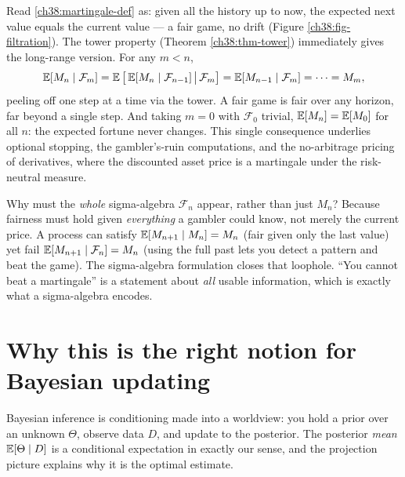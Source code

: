 \begin{applicationbox}
Read \eqref{ch38:martingale-def} as: given all the history up to now, the expected next value equals
the current value --- a fair game, no drift (Figure \ref{ch38:fig-filtration}). The tower property
(Theorem \ref{ch38:thm-tower}) immediately gives the long-range version. For any $m < n$,
\[
  \operatorname{\mathbb{E}}[M_n \mid \mathcal{F}_m]
  = \operatorname{\mathbb{E}}\big[\operatorname{\mathbb{E}}[M_n\mid\mathcal{F}_{n-1}] \,\big|\, \mathcal{F}_m\big]
  = \operatorname{\mathbb{E}}[M_{n-1}\mid\mathcal{F}_m] = \cdots = M_m,
\]
peeling off one step at a time via the tower. A fair game is fair over any horizon, far beyond a single step.
And taking $m=0$ with $\mathcal{F}_0$ trivial, $\operatorname{\mathbb{E}}[M_n] = \operatorname{\mathbb{E}}[M_0]$ for all $n$: the expected fortune
never changes. This single consequence underlies optional stopping, the gambler's-ruin computations,
and the no-arbitrage pricing of derivatives, where the discounted asset price is a martingale under
the risk-neutral measure.
\end{applicationbox}

\begin{happeningbox}
Why must the \emph{whole} sigma-algebra $\mathcal{F}_n$ appear, rather than just $M_n$? Because
fairness must hold given \emph{everything} a gambler could know, not merely the current price.
A process can satisfy $\operatorname{\mathbb{E}}[M_{n+1}\mid M_n] = M_n$ (fair given only the last value) yet fail
$\operatorname{\mathbb{E}}[M_{n+1}\mid\mathcal{F}_n] = M_n$ (using the full past lets you detect a pattern and beat the
game). The sigma-algebra formulation closes that loophole. ``You cannot beat a martingale'' is a
statement about \emph{all} usable information, which is exactly what a sigma-algebra encodes.
\end{happeningbox}

\section{Why this is the right notion for Bayesian updating}
\label{ch38:bayes}

Bayesian inference is conditioning made into a worldview: you hold a prior over an unknown $\Theta$,
observe data $D$, and update to the posterior. The posterior \emph{mean} $\operatorname{\mathbb{E}}[\Theta \mid D]$ is a
conditional expectation in exactly our sense, and the projection picture explains why it is the
optimal estimate.

